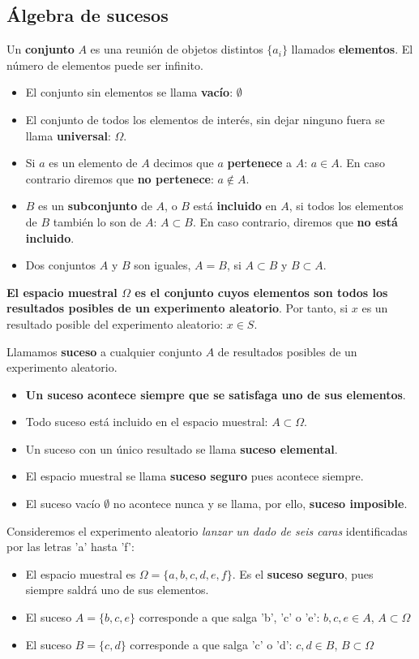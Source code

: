 \documentclass[11pt]{article}
\begin{document}
    \subsection*{Álgebra de sucesos}\label{uxe1lgebra-de-sucesos}

Un \textbf{conjunto} \(A\) es una reunión de objetos distintos
\(\{a_i\}\) llamados \textbf{elementos}. El número de elementos puede
ser infinito. 
\begin{itemize}
\item El conjunto sin elementos se llama \textbf{vacío}:
\(\emptyset\) 
\item El conjunto de todos los elementos de interés, sin dejar
ninguno fuera se llama \textbf{universal}: \(\Omega\). 
\item Si \(a\) es un
elemento de \(A\) decimos que \(a\) \textbf{pertenece} a \(A\):
\(a \in A\). En caso contrario diremos que \textbf{no pertenece}:
\(a \notin A\). 
\item \(B\) es un \textbf{subconjunto} de \(A\), o \(B\)
está \textbf{incluido} en \(A\), si todos los elementos de \(B\) también
lo son de \(A\): \(A\subset B\). En caso contrario, diremos que
\textbf{no está incluido}. 
\item Dos conjuntos \(A\) y \(B\) son iguales,
\(A = B\), si \(A\subset B\) y \(B \subset A\).
\end{itemize}

    \textbf{El espacio muestral \(\Omega\) es el conjunto cuyos elementos
son todos los resultados posibles de un experimento aleatorio}. Por
tanto, si \(x\) es un resultado posible del experimento aleatorio:
\(x \in S\).

Llamamos \textbf{suceso} a cualquier conjunto \(A\) de resultados
posibles de un experimento aleatorio. 
\begin{itemize}
\item \textbf{Un suceso acontece
siempre que se satisfaga uno de sus elementos}. 
\item Todo suceso está
incluido en el espacio muestral: \(A\subset \Omega\). 
\item Un suceso con un
único resultado se llama \textbf{suceso elemental}. 
\item El espacio
muestral se llama \textbf{suceso seguro} pues acontece siempre. 
\item El
suceso vacío \(\emptyset\) no acontece nunca y se llama, por ello,
\textbf{suceso imposible}.
\end{itemize}

    Consideremos el experimento aleatorio \emph{lanzar un dado de seis
caras} identificadas por las letras 'a' hasta 'f': 
\begin{itemize}
\item El espacio muestral
es \(\Omega = \{a, b, c, d, e, f\}\). Es el \textbf{suceso seguro}, pues
siempre saldrá uno de sus elementos. 
\item El suceso \(A = \{b, c, e\}\)
corresponde a que salga 'b', 'c' o 'e': \(b, c, e \in A\),
\(A \subset \Omega\) 
\item El suceso \(B = \{c, d\}\) corresponde a que
salga 'c' o 'd': \(c, d \in B\), \(B \subset \Omega\)
\end{itemize}
\end{document}
